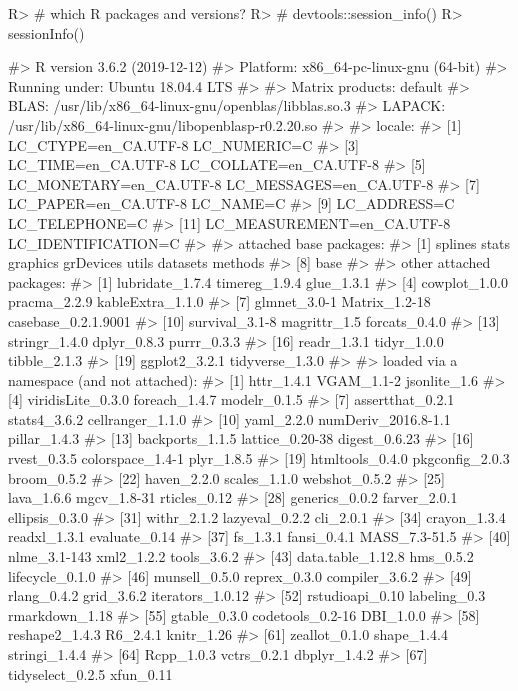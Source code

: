 \documentclass[
]{jss}
\begin{document}
\begin{CodeChunk}

\begin{CodeInput}
R> # which R packages and versions?
R> # devtools::session_info()
R> sessionInfo()
\end{CodeInput}

\begin{CodeOutput}
#> R version 3.6.2 (2019-12-12)
#> Platform: x86_64-pc-linux-gnu (64-bit)
#> Running under: Ubuntu 18.04.4 LTS
#> 
#> Matrix products: default
#> BLAS:   /usr/lib/x86_64-linux-gnu/openblas/libblas.so.3
#> LAPACK: /usr/lib/x86_64-linux-gnu/libopenblasp-r0.2.20.so
#> 
#> locale:
#>  [1] LC_CTYPE=en_CA.UTF-8       LC_NUMERIC=C              
#>  [3] LC_TIME=en_CA.UTF-8        LC_COLLATE=en_CA.UTF-8    
#>  [5] LC_MONETARY=en_CA.UTF-8    LC_MESSAGES=en_CA.UTF-8   
#>  [7] LC_PAPER=en_CA.UTF-8       LC_NAME=C                 
#>  [9] LC_ADDRESS=C               LC_TELEPHONE=C            
#> [11] LC_MEASUREMENT=en_CA.UTF-8 LC_IDENTIFICATION=C       
#> 
#> attached base packages:
#> [1] splines   stats     graphics  grDevices utils     datasets  methods  
#> [8] base     
#> 
#> other attached packages:
#>  [1] lubridate_1.7.4     timereg_1.9.4       glue_1.3.1         
#>  [4] cowplot_1.0.0       pracma_2.2.9        kableExtra_1.1.0   
#>  [7] glmnet_3.0-1        Matrix_1.2-18       casebase_0.2.1.9001
#> [10] survival_3.1-8      magrittr_1.5        forcats_0.4.0      
#> [13] stringr_1.4.0       dplyr_0.8.3         purrr_0.3.3        
#> [16] readr_1.3.1         tidyr_1.0.0         tibble_2.1.3       
#> [19] ggplot2_3.2.1       tidyverse_1.3.0    
#> 
#> loaded via a namespace (and not attached):
#>  [1] httr_1.4.1          VGAM_1.1-2          jsonlite_1.6       
#>  [4] viridisLite_0.3.0   foreach_1.4.7       modelr_0.1.5       
#>  [7] assertthat_0.2.1    stats4_3.6.2        cellranger_1.1.0   
#> [10] yaml_2.2.0          numDeriv_2016.8-1.1 pillar_1.4.3       
#> [13] backports_1.1.5     lattice_0.20-38     digest_0.6.23      
#> [16] rvest_0.3.5         colorspace_1.4-1    plyr_1.8.5         
#> [19] htmltools_0.4.0     pkgconfig_2.0.3     broom_0.5.2        
#> [22] haven_2.2.0         scales_1.1.0        webshot_0.5.2      
#> [25] lava_1.6.6          mgcv_1.8-31         rticles_0.12       
#> [28] generics_0.0.2      farver_2.0.1        ellipsis_0.3.0     
#> [31] withr_2.1.2         lazyeval_0.2.2      cli_2.0.1          
#> [34] crayon_1.3.4        readxl_1.3.1        evaluate_0.14      
#> [37] fs_1.3.1            fansi_0.4.1         MASS_7.3-51.5      
#> [40] nlme_3.1-143        xml2_1.2.2          tools_3.6.2        
#> [43] data.table_1.12.8   hms_0.5.2           lifecycle_0.1.0    
#> [46] munsell_0.5.0       reprex_0.3.0        compiler_3.6.2     
#> [49] rlang_0.4.2         grid_3.6.2          iterators_1.0.12   
#> [52] rstudioapi_0.10     labeling_0.3        rmarkdown_1.18     
#> [55] gtable_0.3.0        codetools_0.2-16    DBI_1.0.0          
#> [58] reshape2_1.4.3      R6_2.4.1            knitr_1.26         
#> [61] zeallot_0.1.0       shape_1.4.4         stringi_1.4.4      
#> [64] Rcpp_1.0.3          vctrs_0.2.1         dbplyr_1.4.2       
#> [67] tidyselect_0.2.5    xfun_0.11
\end{CodeOutput}
\end{CodeChunk}
\end{document}
